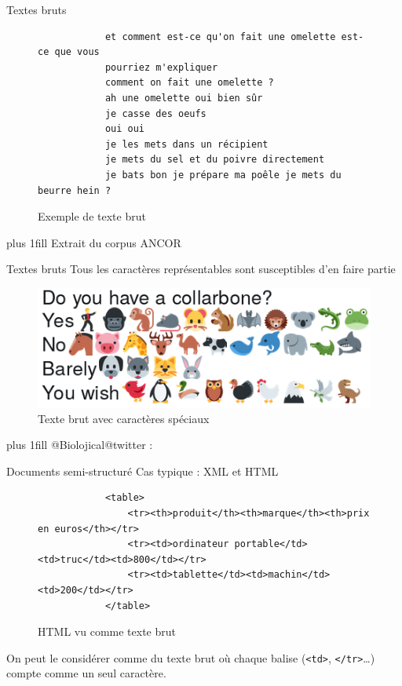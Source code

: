\documentclass[xcolor={svgnames}, french]{beamer}
\begin{document}
\begin{frame}[fragile=singleslide]{Textes bruts}
	\begin{figure}
		\begin{verbatim}
			et comment est-ce qu'on fait une omelette est-ce que vous
			pourriez m'expliquer
			comment on fait une omelette ?
			ah une omelette oui bien sûr
			je casse des oeufs
			oui oui
			je les mets dans un récipient
			je mets du sel et du poivre directement
			je bats bon je prépare ma poêle je mets du beurre hein ?
		\end{verbatim}
		\caption{Exemple de texte brut}
	\end{figure}
	\vskip0pt plus 1fill
	{\tiny Extrait du corpus ANCOR \parencite{muzerelle2013ANCORPremierCorpus}}
\end{frame}

\begin{frame}{Textes bruts}
	\alert{Tous} les caractères représentables sont susceptibles d'en faire partie
	\begin{figure}
		\includegraphics[width=\textwidth, height=0.8\textheight, keepaspectratio]{pics/raw_emoji.png}
		\caption{Texte brut avec caractères spéciaux}
	\end{figure}
	\vskip0pt plus 1fill
	{\tiny @Biolojical@twitter : }
\end{frame}

\begin{frame}[fragile=singleslide]{Documents semi-structuré}
	Cas typique : XML et HTML
	\begin{figure}
		\begin{verbatim}
			<table>
				<tr><th>produit</th><th>marque</th><th>prix en euros</th></tr>
				<tr><td>ordinateur portable</td><td>truc</td><td>800</td></tr>
				<tr><td>tablette</td><td>machin</td><td>200</td></tr>
			</table>
		\end{verbatim}
		\caption{HTML vu comme texte brut}
	\end{figure}
	On peut le considérer comme du texte brut où chaque balise (\texttt{<td>}, \texttt{</tr>}…) compte comme un seul caractère.
\end{frame}
\end{document}
